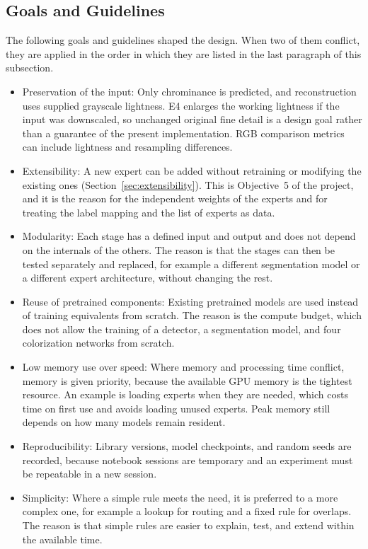 \documentclass{FastFyp}
\begin{document}
\subsection{Goals and Guidelines}

The following goals and guidelines shaped the design. When two of them conflict, they are applied in the order in which they are listed in the last paragraph of this subsection.

\begin{itemize}
    \item Preservation of the input: Only chrominance is predicted, and reconstruction uses supplied grayscale lightness. E4 enlarges the working lightness if the input was downscaled, so unchanged original fine detail is a design goal rather than a guarantee of the present implementation. RGB comparison metrics can include lightness and resampling differences.
    \item Extensibility: A new expert can be added without retraining or modifying the existing ones (Section~\ref{sec:extensibility}). This is Objective~5 of the project, and it is the reason for the independent weights of the experts and for treating the label mapping and the list of experts as data.
    \item Modularity: Each stage has a defined input and output and does not depend on the internals of the others. The reason is that the stages can then be tested separately and replaced, for example a different segmentation model or a different expert architecture, without changing the rest.
    \item Reuse of pretrained components: Existing pretrained models are used instead of training equivalents from scratch. The reason is the compute budget, which does not allow the training of a detector, a segmentation model, and four colorization networks from scratch.
    \item Low memory use over speed: Where memory and processing time conflict, memory is given priority, because the available GPU memory is the tightest resource. An example is loading experts when they are needed, which costs time on first use and avoids loading unused experts. Peak memory still depends on how many models remain resident.
    \item Reproducibility: Library versions, model checkpoints, and random seeds are recorded, because notebook sessions are temporary and an experiment must be repeatable in a new session.
    \item Simplicity: Where a simple rule meets the need, it is preferred to a more complex one, for example a lookup for routing and a fixed rule for overlaps. The reason is that simple rules are easier to explain, test, and extend within the available time.
\end{itemize}
\end{document}
